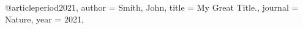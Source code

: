 @article{period2021,
  author = {Smith, John},
  title = {My Great Title.},
  journal = {Nature},
  year = {2021},
}
